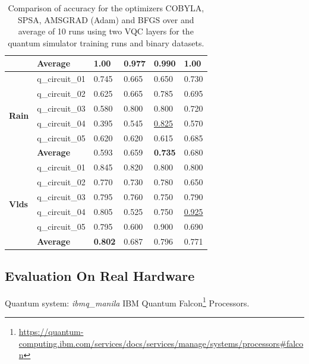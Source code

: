 \begin{table}[!h]
\begin{tabular}{p{}p{}|p{}p{}p{}p{}}
		\cline{2-6} 
		                        & \textbf{Average}      & \textbf{1.00}  & 0.977 & 0.990   & \textbf{1.00} \\
		\hline 
		\multirow{6}{*}{\textbf{Rain}}   & q\_circuit\_01 & 0.745  & 0.665 & 0.650   & 0.730 \\
		                        & q\_circuit\_02 & 0.625  & 0.665 & 0.785   & 0.695 \\
		                        & q\_circuit\_03 & 0.580 & 0.800 & 0.800  & 0.720 \\
		                        & q\_circuit\_04 & 0.395  & 0.545 & \underline{0.825}   & 0.570 \\
		                        & q\_circuit\_05 & 0.620 & 0.620 & 0.615   & 0.685 \\
		\cline{2-6} 
		                        & \textbf{Average}      & 0.593  & 0.659 & \textbf{0.735}   & 0.680 \\
		\hline 
		\multirow{6}{*}{\textbf{Vlds}}   & q\_circuit\_01 & 0.845  & 0.820 & 0.800   & 0.800 \\
		                        & q\_circuit\_02 & 0.770  & 0.730 & 0.780   & 0.650 \\
		                        & q\_circuit\_03 & 0.795  & 0.760 & 0.750   & 0.790 \\
		                        & q\_circuit\_04 & 0.805  & 0.525 & 0.750   & \underline{0.925} \\
		                        & q\_circuit\_05 & 0.795  & 0.600 & 0.900   & 0.690 \\
		\cline{2-6} 
		                        & \textbf{Average}      & \textbf{0.802}  & 0.687 & 0.796   & 0.771 \\
		\hline
	\end{tabular}
	\caption{Comparison of accuracy for the optimizers COBYLA, SPSA, AMSGRAD (Adam) and BFGS over and average of 10 runs using two VQC layers for the quantum simulator training runs and binary datasets.}
	\label{table:accuracy_comparison_binary_dataset_and_optimizers_training_runs}
\end{table}


\subsection{Evaluation On Real Hardware}
Quantum system: \textit{ibmq\_manila} IBM Quantum Falcon\footnote{\url{https://quantum-computing.ibm.com/services/docs/services/manage/systems/processors#falcon}} Processors.

